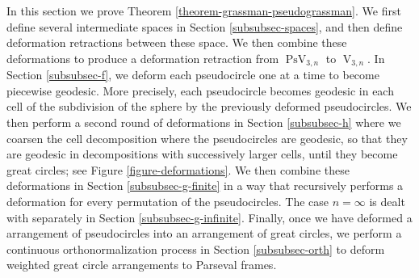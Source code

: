 \documentclass[JEP,XML,SOM,Unicode,NoFloatCountersInSection,published]{cedram}
\theoremstyle{remark}
\DeclareMathOperator{\stief}{V}
\DeclareMathOperator{\pstief}{PsV}
\begin{document}
In this section we prove Theorem \ref{theorem-grassman-pseudograssman}.
We first define several intermediate spaces in Section \ref{subsubsec-spaces}, and then define deformation retractions between these space. We then combine these deformations to produce a deformation retraction from $\pstief_{3,n}$ to $\stief_{3,n}$.
In Section \ref{subsubsec-f}, we deform each pseudocircle one at a time to become piecewise geodesic. More precisely, each pseudocircle becomes geodesic in each cell of the subdivision of the sphere by the previously deformed pseudocircles. We then perform a second round of deformations in Section \ref{subsubsec-h} where we coarsen the cell decomposition where the pseudocircles are geodesic, so that they are geodesic in decompositions with successively larger cells, until they become great circles; see Figure \ref{figure-deformations}. We then combine these deformations in Section \ref{subsubsec-g-finite} in a way that recursively performs a deformation for every permutation of the pseudocircles. The case $n=\infty$ is dealt with separately in Section \ref{subsubsec-g-infinite}. Finally, once we have deformed a arrangement of pseudocircles into an arrangement of great circles, we perform a continuous orthonormalization process in Section \ref{subsubsec-orth} to deform weighted great circle arrangements to Parseval frames.
\end{document}
